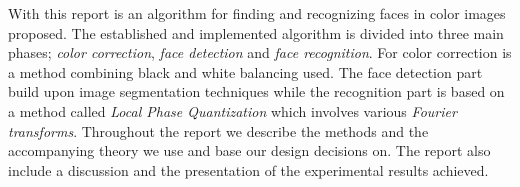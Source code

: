 With this report is an algorithm for finding and recognizing faces in color images proposed. The established and implemented algorithm is divided into three main phases; \textit{color correction}, \textit{face detection} and \textit{face recognition}. For color correction is a method combining black and white balancing used. The face detection part build upon image segmentation techniques while the recognition part is based on a method called \textit{Local Phase Quantization} which involves various \textit{Fourier transforms}. Throughout the report we describe the methods and the accompanying theory we use and base our design decisions on. The report also include a discussion and the presentation of the experimental results achieved. 
